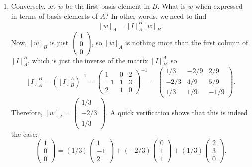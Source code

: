 \documentclass[12pt]{article}
\begin{document}
\begin{enumerate}
\item Conversely, let $w$ be the first basis element in $B$.  What is $w$ when expressed in terms of basis elements of $A$?  In other words, we need to find $$[w]_A=[I]^B_A[w]_B.$$  Now, $[w]_B$ is just $\begin{pmatrix} 1\\0\\0 \end{pmatrix}$, so $[w]_A$ is nothing more than the first column of $[I]^B_A$, which is just the inverse of the matrix $[I]^A_B$, so $$[I]^B_A={([I]^A_B)}^{-1}=\begin{pmatrix} 1&0&2 \\ -1&1&3 \\ 2&1&0 \end{pmatrix}^{-1}=\begin{pmatrix} 1/3&-2/9&2/9 \\ -2/3&4/9&5/9 \\ 1/3&1/9&-1/9 \end{pmatrix}.$$  Therefore, $[w]_A=\begin{pmatrix}1/3\\-2/3\\1/3 \end{pmatrix}$.  A quick verification shows that this is indeed the case: $$\begin{pmatrix}1\\0\\0\end{pmatrix}= (1/3) \begin{pmatrix}1\\-1\\2\end{pmatrix} + (-2/3)\begin{pmatrix}0\\1\\1\end{pmatrix} + (1/3)\begin{pmatrix}2\\3\\0\end{pmatrix}.$$

\end{enumerate}
\end{document}
